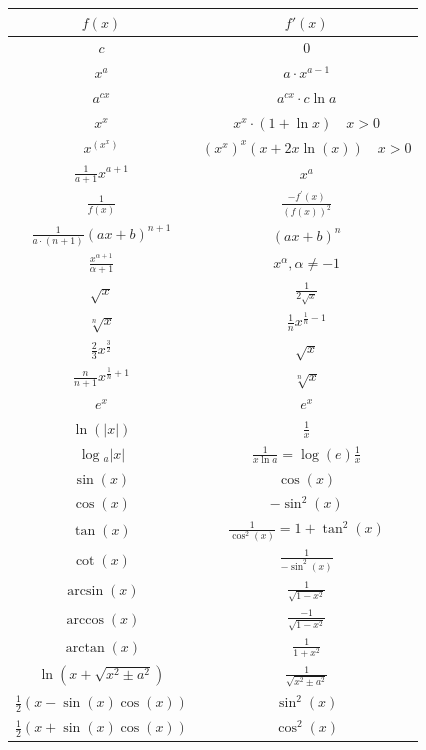 \begin{center}
\begin{center}
    \begin{tabular}{c||c}
        $f(x)$ & $f'(x)$ \\
        \hline$c$ & 0 \\
        $x^{a}$ & $a \cdot x^{a-1}$ \\
        $a^{c x}$ & $a^{c x} \cdot c \ln a$ \\
        $x^{x}$ & $x^{x} \cdot(1+\ln x) \quad x>0$ \\
        $x^{\left(x^{x}\right)}$ & $\left(x^{x}\right)^{x}(x+2 x \ln (x)) \quad x>0$ \\
        $\frac{1}{a+1} x^{a+1}$ & $x^{a}$ \\
        $\frac{1}{f(x)}$ & $\frac{-f^{\prime}(x)}{(f(x))^{2}}$ \\
        $\frac{1}{a \cdot(n+1)}(a x+b)^{n+1}$ & $(a x+b)^{n}$ \\
        $\frac{x^{\alpha+1}}{\alpha+1}$ & $x^{\alpha}, \alpha \neq-1$ \\
        $\sqrt{x}$ & $\frac{1}{2 \sqrt{x}}$ \\
        $\sqrt[n]{x}$ & $\frac{1}{n} x^{\frac{1}{n}-1}$ \\
        $\frac{2}{3} x^{\frac{3}{2}}$ & $\sqrt{x}$ \\
        $\frac{n}{n+1} x^{\frac{1}{n}+1}$ & $\sqrt[n]{x}$ \\
        $e^{x}$ & $e^{x}$ \\
        $\ln (|x|)$ & $\frac{1}{x}$ \\
        $\log { }_{a}|x|$ & $\frac{1}{x \ln a}=\log (e) \frac{1}{x}$ \\
        $\sin (x)$ & $\cos (x)$ \\
        $\cos (x)$ & $-\sin ^{2}(x)$ \\
        $\tan (x)$ & $\frac{1}{\cos ^{2}(x)}=1+\tan ^{2}(x)$ \\
        $\cot (x)$ & $\frac{1}{-\sin ^{2}(x)}$ \\
        $\arcsin (x)$ & $\frac{1}{\sqrt{1-x^{2}}}$ \\
        $\arccos (x)$ & $\frac{-1}{\sqrt{1-x^{2}}}$ \\
        $\arctan (x)$ & $\frac{1}{1+x^{2}}$ \\
          $\ln \left(x+\sqrt{x^{2} \pm a^{2}}\right)$ & $\frac{1}{\sqrt{x^{2} \pm a^{2}}}$ \\
         $\frac{1}{2}(x-\sin (x) \cos (x))$ & $\sin ^{2}(x)$ \\
         $\frac{1}{2}(x+\sin (x) \cos (x))$ & $\cos ^{2}(x)$ \\

\end{tabular}
\end{center}
\end{center}
